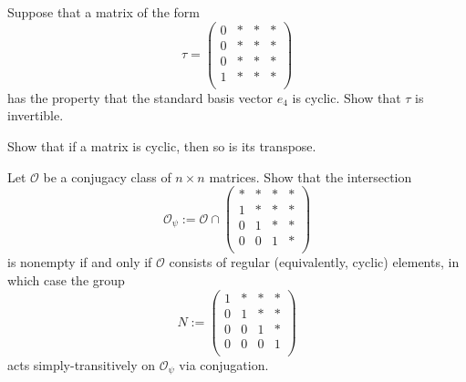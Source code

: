 \documentclass[reqno]{amsart} 
\begin{document}
\begin{exercise}\label{exercise:d1aa77216096}
  Suppose that a matrix of the form
  \begin{equation*}
    \tau =
    \begin{pmatrix}
      0 & \ast & \ast & \ast \\
      0 & \ast & \ast & \ast \\
      0 & \ast & \ast & \ast \\
      1 & \ast & \ast & \ast \\
    \end{pmatrix}
  \end{equation*}
  has the property that the standard basis vector $e_4$ is cyclic.  Show that $\tau$ is invertible.
\end{exercise}

\begin{exercise}\label{exercise:d1aa77219196}
  Show that if a matrix is cyclic, then so is its transpose.
\end{exercise}

\begin{exercise}\label{exercise:d1bb02a2fbb1}
  Let $\mathcal{O}$ be a conjugacy class of $n \times n$ matrices.  Show that the intersection
  \begin{equation*}
    \mathcal{O}_{\psi}
    :=
    \mathcal{O} \cap
    \begin{pmatrix}
      \ast & \ast & \ast & \ast \\
      1 & \ast & \ast & \ast \\
      0 & 1 & \ast & \ast \\
      0 & 0 & 1 & \ast \\
    \end{pmatrix}
  \end{equation*}
  is nonempty if and only if $\mathcal{O}$ consists of regular (equivalently, cyclic) elements, in which case the group
  \begin{equation*}
    N :=
    \begin{pmatrix}
      1 & \ast & \ast & \ast \\
      0 & 1 & \ast & \ast \\
      0 & 0 & 1 & \ast \\
      0 & 0 & 0 & 1 \\
    \end{pmatrix}  
  \end{equation*}
  acts simply-transitively on $\mathcal{O}_{\psi}$ via conjugation.
\end{exercise}



{} 
\end{document}
